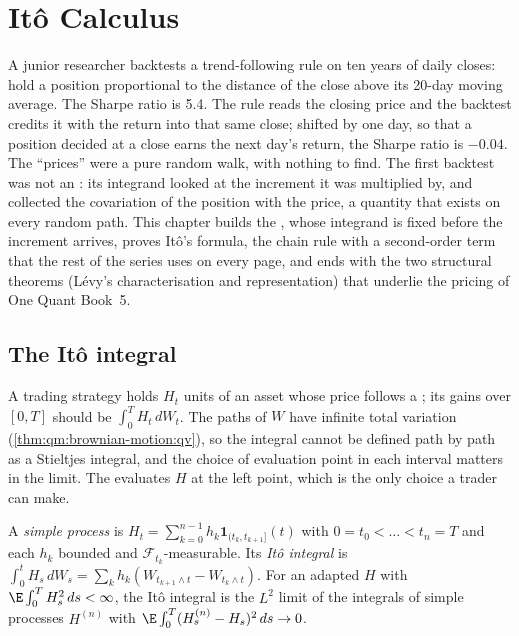 \chapter{Itô Calculus}\label{ch:qm:ito-calculus}

A junior researcher backtests a trend-following rule on ten years of daily closes: hold a
position proportional to the distance of the close above its 20-day moving average. The
Sharpe ratio is 5.4. The rule reads the closing price and the backtest credits it with the
return into that same close; shifted by one day, so that a position decided at a close
earns the next day's return, the Sharpe ratio is $-0.04$. The ``prices'' were a pure random
walk, with nothing to find. The first backtest was not an : its integrand looked
at the increment it was multiplied by, and collected the covariation of the position with the
price, a quantity that exists on every random path. This chapter builds the ,
whose integrand is fixed before the increment arrives, proves Itô's formula, the chain rule
with a second-order term that the rest of the series uses on every page, and ends with the
two structural theorems (Lévy's characterisation and  representation) that
underlie the pricing of One Quant Book~5.

\section{The Itô integral}

A trading strategy holds $H_t$ units of an asset whose price follows a ; its
gains over $[0, T]$ should be $\int_0^T H_t\,dW_t$. The paths of $W$ have infinite total variation
(\cref{thm:qm:brownian-motion:qv}), so the integral cannot be defined path by path as a
Stieltjes integral, and the choice of evaluation point in each interval matters in the limit.
The  evaluates $H$ at the left point, which is the only choice a trader can make.

\begin{definition}\label{def:qm:ito-calculus:integral}
A \emph{simple process} is $H_t = \sum_{k=0}^{n-1}h_k\mathbf 1_{(t_k,
t_{k+1}]}(t)$ with $0 = t_0 < \dots < t_n = T$ and each $h_k$ bounded and $\mathcal
F_{t_k}$-measurable. Its \emph{Itô integral} is $\int_0^t H_s\,dW_s = \sum_k
h_k(W_{t_{k+1}\wedge t} - W_{t_k\wedge t})$. For an adapted $H$ with $\E\int_0^T H_s^2\,ds <
\infty$, the Itô integral is the $L^2$ limit of the integrals of simple processes $H^{(n)}$ with
$\E\int_0^T(H^{(n)}_s - H_s)^2\,ds \to 0$.
\end{definition}

